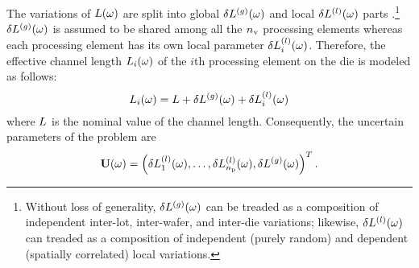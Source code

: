 
The variations of $L(\omega)$ are split into global ${\delta L^{(g)}}(\omega)$ and local $\delta L^{(l)}(\omega)$ parts \cite{chandra2010, shen2009}.\footnote{Without loss of generality, ${\delta L^{(g)}}(\omega)$ can be treaded as a composition of independent inter-lot, inter-wafer, and inter-die variations; likewise, $\delta L^{(l)}(\omega)$ can treaded as a composition of independent (purely random) and dependent (spatially correlated) local variations.}
${\delta L^{(g)}}(\omega)$ is assumed to be shared among all the ${n_\text{v}}$ processing elements whereas each processing element has its own local parameter $\delta L^{(l)}_i(\omega)$.
Therefore, the effective channel length $L_i(\omega)$ of the $i$th processing element on the die is modeled as follows:
\begin{equation} \elabel{leakage-partition}
  \Leff_i(\o) = \nLeff + \gLeff(\o) + \lLeff_i(\o)
\end{equation}
where $L$ is the nominal value of the channel length. Consequently, the uncertain parameters of the problem are
\begin{equation} \elabel{uncertain-parameters}
  \vU(\o) = \vec{\lLeff_1(\o), \dotsc, \lLeff_\nprocs(\o), \gLeff(\o) }.
\end{equation}


